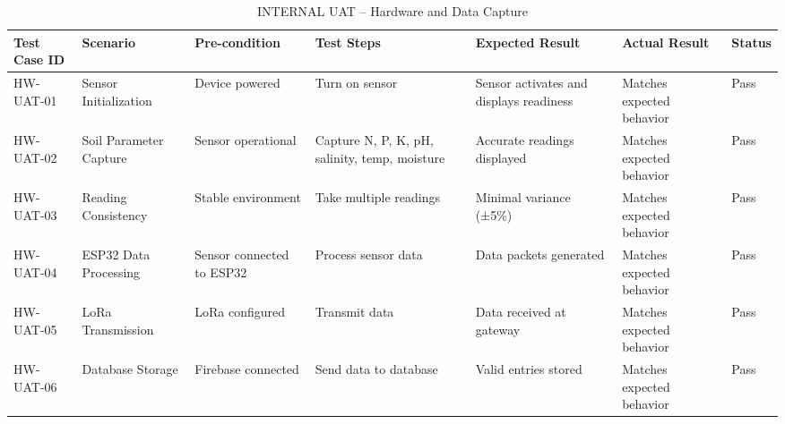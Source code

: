 {	\begin{table}[H]
		\centering
		\caption{INTERNAL UAT – Hardware and Data Capture}
		\renewcommand{\arraystretch}{1.2}
		\begin{adjustbox}{max width=\textwidth}
			\begin{tabular}{p{2cm}p{3cm}p{3cm}p{3cm}p{4cm}p{4cm}p{1.5cm}}
				\toprule
				\textbf{Test Case ID} & \textbf{Scenario} & \textbf{Pre-condition} & \textbf{Test Steps} & \textbf{Expected Result} & \textbf{Actual Result} & \textbf{Status} \\
				\midrule
				HW-UAT-01 & Sensor Initialization & Device powered & Turn on sensor & Sensor activates and displays readiness & Matches expected behavior & Pass \\
				HW-UAT-02 & Soil Parameter Capture & Sensor operational & Capture N, P, K, pH, salinity, temp, moisture & Accurate readings displayed & Matches expected behavior & Pass \\
				HW-UAT-03 & Reading Consistency & Stable environment & Take multiple readings & Minimal variance (±5\%) & Matches expected behavior & Pass \\
				HW-UAT-04 & ESP32 Data Processing & Sensor connected to ESP32 & Process sensor data & Data packets generated & Matches expected behavior & Pass \\
				HW-UAT-05 & LoRa Transmission & LoRa configured & Transmit data & Data received at gateway & Matches expected behavior & Pass \\
				HW-UAT-06 & Database Storage & Firebase connected & Send data to database & Valid entries stored & Matches expected behavior & Pass \\
				\bottomrule
			\end{tabular}
		\end{adjustbox}
	\end{table}
	
}

